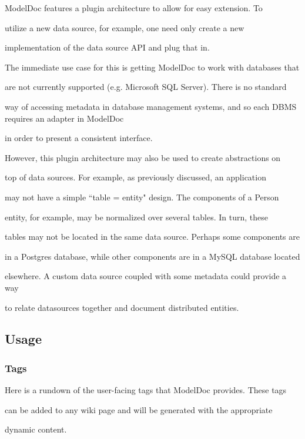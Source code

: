 \documentclass{acm_proc_article-sp}
\begin{document}
ModelDoc features a plugin architecture to allow for easy extension.  To

utilize a new data source, for example, one need only create a new

implementation of the data source API and plug that in.



The immediate use case for this is getting ModelDoc to work with databases that

are not currently supported (e.g. Microsoft SQL Server).  There is no standard

way of accessing metadata in database management systems, and so each DBMS requires an adapter in ModelDoc

in order to present a consistent interface.



However, this plugin architecture may also be used to create abstractions on

top of data sources.  For example, as previously discussed, an application

may not have a simple ``table = entity" design.  The components of a Person

entity, for example, may be normalized over several tables.  In turn, these

tables may not be located in the same data source.  Perhaps some components are

in a Postgres database, while other components are in a MySQL database located

elsewhere.  A custom data source coupled with some metadata could provide a way

to relate datasources together and document distributed entities.



\subsection{Usage}



\subsubsection{Tags}

Here is a rundown of the user-facing tags that ModelDoc provides.  These tags

can be added to any wiki page and will be generated with the appropriate

dynamic content.
\end{document}
